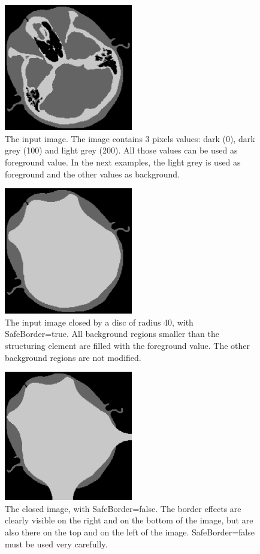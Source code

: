 \documentclass[IJ]{cesj}
\begin{document}
\begin{figure}[b]
\centering
\includegraphics[width=0.5\textwidth]{2th_cthead1.eps}
\caption{The input image. The image contains 3 pixels values: dark (0), dark grey (100) and light grey (200). All those values can be used as foreground value. In the next examples, the light grey is used as foreground and the other values as background.}
\end{figure}

\begin{figure}
\centering
\includegraphics[width=0.5\textwidth]{close.eps}
\caption{The input image closed by a disc of radius 40, with SafeBorder=true. All background regions smaller than the structuring element are filled with the foreground value. The other background regions are not modified.}
\end{figure}

\begin{figure}
\centering
\includegraphics[width=0.5\textwidth]{close-unsafe.eps}
\caption{The closed image, with SafeBorder=false. The border effects are clearly visible on the right and on the bottom of the image, but are also there on the top and on the left of the image. SafeBorder=false must be used very carefully.}
\end{figure}
\end{document}
